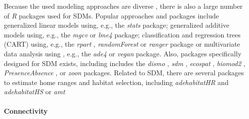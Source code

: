 \documentclass[smallextended]{svjour3}       %
\begin{document}
Because the used modeling approaches are diverse \cite{Hooten2011,Kerr2011,Fletcher2019}, there is also a large number of \emph{R} packages used for SDMs.
Popular approaches and packages include generalized linear models using, e.g., the \emph{stats} \cite{RCoreTeam2019} package; generalized additive models using, e.g., the \emph{mgcv} \cite{Wood2017} or \emph{lme4} \cite{Bates2015} package; classification and regression trees (CART) using, e.g., the \emph{rpart} \cite{Therneau2019}, \emph{randomForest} \cite{Liaw2002} or \emph{ranger} \cite{Wright2017} package or multivariate data analysis using , e.g., the \emph{ade4} \cite{Dray2007} or \emph{vegan} \cite{Oksanen2019} package.
Also, packages specifically designed for SDM exists, including includes the \emph{dismo} \cite{Hijmans2017}, \emph{sdm} \cite{Naimi2016}, \emph{ecospat} \cite{Broennimann2020}, \emph{biomod2} \cite{Thuiller2020}, \emph{PresenceAbsence} \cite{Freeman2008}, or \emph{zoon} \cite{Golding2018} packages.
Related to SDM, there are several packages to estimate home ranges and habitat selection, including \emph{adehabitatHR} and \emph{adehabitatHS} \cite{Calenge2006} or \emph{amt \cite{Signer2019}}

\hypertarget{sec:connectivity}{%
\paragraph{Connectivity}\label{sec:connectivity}}
\end{document}
